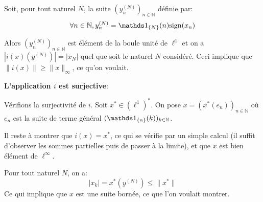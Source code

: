 Soit, pour tout naturel $N$, la suite $(y^{(N)}_n)_{n\in\mathbb{N}}$
définie par:
$$\forall n\in\mathbb{N} , y_n^{(N)}= \ind_{\{N\}}(n)\mathrm{sign}(x_n)$$

Alors $(y^{(N)}_n)_{n\in\mathbb{N}}$ est élément de la boule unité
de $\ell^1$ et on a $|i(x)(y^{(N)})| = |x_N|$ quel que soit
le naturel $N$ considéré.
Ceci implique que $\|i(x)\|\geq \|x\|_\infty$, ce qu'on voulait. \newline

\textbf{L'application $i$ est surjective}:

Vérifions la surjectivité de $i$.
Soit $x^*\in (\ell^1)^*$. On pose $x = (x^*(e_n))_{n\in\mathbb{N}}$ où $e_n$
est la suite de terme général $(\ind_{\{n\}}(k))_{k\in\mathbb{N}}$.

Il reste à montrer que $i(x) = x^*$, ce qui se vérifie par
un simple calcul (il suffit d'observer les sommes partielles
puis de passer à la limite), et que $x$ est bien élément de $\ell^\infty$.

Pour tout naturel $N$, on a:
$$|x_k| = x^*(y^{(N)})\leq \|x^*\|$$
Ce qui implique que $x$ est
une suite bornée, ce que l'on voulait montrer.


